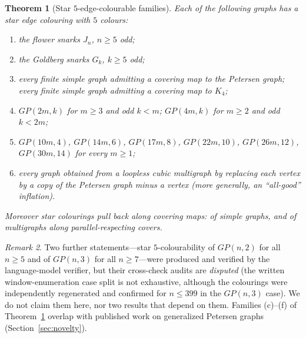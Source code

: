 \documentclass[11pt]{amsart}
\newtheorem{theorem}{Theorem}[section]
\theoremstyle{definition}
\theoremstyle{remark}
\newtheorem{remark}[theorem]{Remark}
\begin{document}
\begin{theorem}[Star $5$-edge-colourable families]\label{thm:five}
Each of the following graphs has a star edge colouring with $5$ colours:
\begin{enumerate}[label=(\alph*)]
\item the flower snarks $J_n$, $n\ge 5$ odd;
\item the Goldberg snarks $G_k$, $k\ge 5$ odd;
\item every finite simple graph admitting a covering map to the Petersen graph; every finite simple graph admitting a covering map to $K_4$;
\item $GP(2m,k)$ for $m\ge 3$ and odd $k<m$; $GP(4m,k)$ for $m\ge 2$ and odd $k<2m$;
\item $GP(10m,4)$, $GP(14m,6)$, $GP(17m,8)$, $GP(22m,10)$, $GP(26m,12)$, $GP(30m,14)$ for every $m\ge 1$;
\item every graph obtained from a loopless cubic multigraph by replacing each vertex by a copy of the Petersen graph minus a vertex (more generally, an ``all-good'' inflation).
\end{enumerate}
Moreover star colourings pull back along covering maps: of simple graphs, and of multigraphs along parallel-respecting covers.
\end{theorem}

\begin{remark}
Two further statements---star $5$-colourability of $GP(n,2)$ for all $n\ge5$ and of $GP(n,3)$ for all $n\ge 7$---were produced and verified by the language-model verifier, but their cross-check audits are \emph{disputed} (the written window-enumeration case split is not exhaustive, although the colourings were independently regenerated and confirmed for $n\le 399$ in the $GP(n,3)$ case). We do not claim them here, nor two results that depend on them. Families (c)--(f) of Theorem~\ref{thm:five} overlap with published work on generalized Petersen graphs (Section~\ref{sec:novelty}).
\end{remark}
\end{document}
